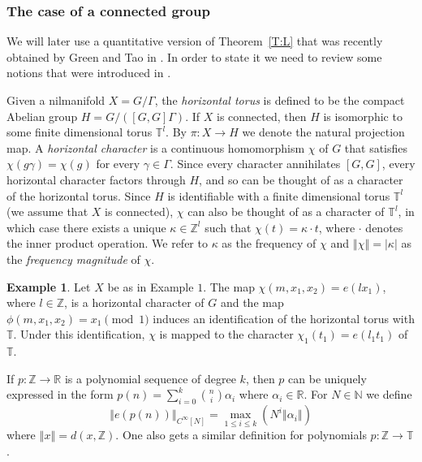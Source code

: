 \documentclass[11pt]{amsart}
\newcommand{\T}{\mathbb{T}}
\newcommand{\R}{\mathbb{R}}
\newcommand{\N}{\mathbb{N}}
\newcommand{\Z}{\mathbb{Z}}
\newcommand{\norm}[1]{\left\Vert #1\right\Vert}
\theoremstyle{plain}
\theoremstyle{definition}
\newtheorem{example}{Example}
\theoremstyle{remark}
\begin{document}
\subsubsection{The case of a connected group} We will later use a
quantitative version of Theorem~\ref{T:L} that was recently obtained
by Green and Tao in \cite{GT}. In order to state it we need to review
some notions that were introduced in \cite{GT}.

Given a nilmanifold $X=G/\Gamma$, the {\em horizontal torus} is
defined to be the compact Abelian group $H=G/([G,G]\Gamma)$.  If $X$
is connected, then $H$ is isomorphic to some finite dimensional torus
$\T^l$. By $\pi\colon X\to H$ we denote the natural projection map.  A
\emph{horizontal character} is a continuous homomorphism $\chi$ of $G$ that
satisfies $\chi(g\gamma)=\chi(g)$ for every $\gamma\in\Gamma$. Since
every character annihilates $[G,G]$, every horizontal character factors
through $H$, and so can be thought of as a character of the horizontal
torus. Since $H$ is identifiable with a finite dimensional torus
$\T^l$ (we assume that $X$ is connected), $\chi$ can also be thought
of as a character of $\T^l$, in which case there exists a unique
$\kappa\in\Z^l$ such that $\chi(t)=\kappa\cdot t$, where $\cdot$
denotes the inner product operation.  We refer to $\kappa$ as the
frequency of $\chi$ and $\norm{\chi}=|\kappa|$ as the \emph{frequency
  magnitude} of $\chi$.

\begin{example}
  Let $X$ be as in Example $1$.  The map $\chi(m,x_1,x_2)=e(lx_1)$,
  where $l\in\Z$, is a horizontal character of $G$ and the map
  $\phi(m,x_1,x_2)=x_1 \pmod{1}$ induces an identification of the
  horizontal torus with $\T$.  Under this identification, $\chi$ is
  mapped to the character $\chi_1(t_1)=e(l_1t_1)$ of $\T$.
\end{example}


If $p\colon\Z\to \R$ is a polynomial sequence of degree $k$,
then $p$ can be uniquely expressed in the form $
p(n)=\sum_{i=0}^k\binom{n}{i}\alpha_i $ where $\alpha_i\in\R$. For $N\in\N$ we
define
\begin{equation}\label{E:norms}
\norm{e(p(n))}_{C^\infty[N]}=\max_{1\leq i\leq k}( N^i \norm{\alpha_i})
\end{equation}
where $\norm{x}=d(x,\Z)$.  One also gets a similar definition for polynomials
$p\colon \Z\to \T$.

\end{document}
